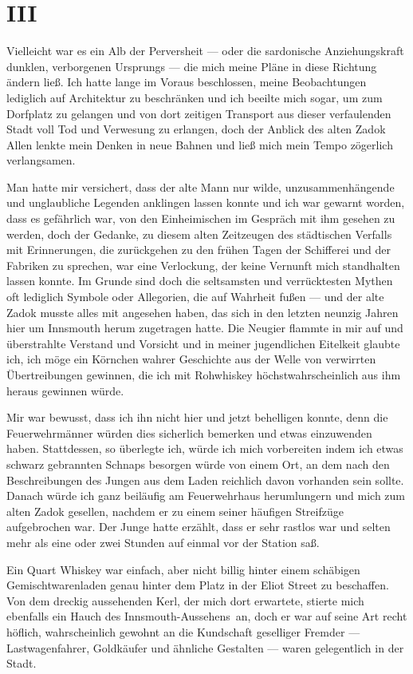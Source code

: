 \chapter*{III}

Vielleicht war es ein Alb der Perversheit --- oder die sardonische Anziehungskraft dunklen, verborgenen Ursprungs --- die mich meine Pläne in diese Richtung ändern ließ. Ich hatte lange im Voraus beschlossen, meine Beobachtungen lediglich auf Architektur zu beschränken und ich beeilte mich sogar, um zum Dorfplatz zu gelangen und von dort zeitigen Transport aus dieser verfaulenden Stadt voll Tod und Verwesung zu erlangen, doch der Anblick des alten Zadok Allen lenkte mein Denken in neue Bahnen und ließ mich mein Tempo zögerlich verlangsamen.

Man hatte mir versichert, dass der alte Mann nur wilde, unzusammenhängende und unglaubliche Legenden anklingen lassen konnte und ich war gewarnt worden, dass es gefährlich war, von den Einheimischen im Gespräch mit ihm gesehen zu werden, doch der Gedanke, zu diesem alten Zeitzeugen des städtischen Verfalls mit Erinnerungen, die zurückgehen zu den frühen Tagen der Schifferei und der Fabriken zu sprechen, war eine Verlockung, der keine Vernunft mich standhalten lassen konnte. Im Grunde sind doch die seltsamsten und verrücktesten Mythen oft lediglich Symbole oder Allegorien, die auf Wahrheit fußen --- und der alte Zadok musste alles mit angesehen haben, das sich in den letzten neunzig Jahren hier um Innsmouth herum zugetragen hatte. Die Neugier flammte in mir auf und überstrahlte Verstand und Vorsicht und in meiner jugendlichen Eitelkeit glaubte ich, ich möge ein Körnchen wahrer Geschichte aus der Welle von verwirrten Übertreibungen gewinnen, die ich mit Rohwhiskey höchstwahrscheinlich aus ihm heraus gewinnen würde.

Mir war bewusst, dass ich ihn nicht hier und jetzt behelligen konnte, denn die Feuerwehrmänner würden dies sicherlich bemerken und etwas einzuwenden haben. Stattdessen, so überlegte ich, würde ich mich vorbereiten indem ich etwas schwarz gebrannten Schnaps besorgen würde von einem Ort, an dem nach den Beschreibungen des Jungen aus dem Laden reichlich davon vorhanden sein sollte. Danach würde ich ganz beiläufig am Feuerwehrhaus herumlungern und mich zum alten Zadok gesellen, nachdem er zu einem seiner häufigen Streifzüge aufgebrochen war. Der Junge hatte erzählt, dass er sehr rastlos war und selten mehr als eine oder zwei Stunden auf einmal vor der Station saß.

Ein Quart Whiskey war einfach, aber nicht billig hinter einem schäbigen Gemischtwarenladen genau hinter dem Platz in der Eliot Street zu beschaffen. Von dem dreckig aussehenden Kerl, der mich dort erwartete, stierte mich ebenfalls ein Hauch des \glqq Innsmouth-Aussehens\grqq\ an, doch er war auf seine Art recht höflich, wahrscheinlich gewohnt an die Kundschaft geselliger Fremder --- Lastwagenfahrer, Goldkäufer und ähnliche Gestalten --- waren gelegentlich in der Stadt.

